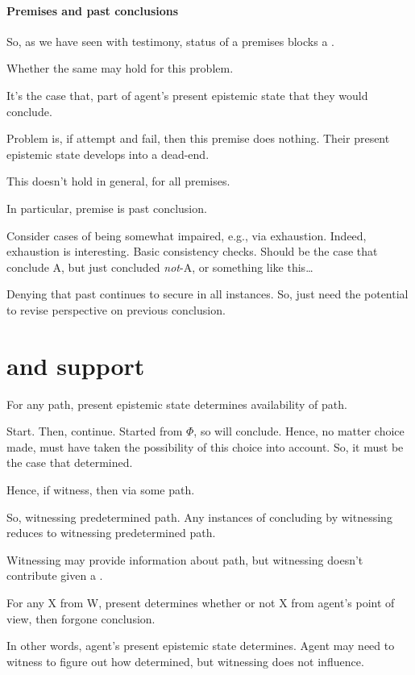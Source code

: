 \paragraph{Premises and past conclusions}

\begin{note}[Premises]
  So, as we have seen with testimony, status of a premises blocks a \requ{}.

  Whether the same may hold for this problem.

  It's the case that, part of agent's present epistemic state that they would conclude.

  Problem is, if attempt and fail, then this premise does nothing.
  Their present epistemic state develops into a dead-end.
\end{note}

\begin{note}[Note!]
  This doesn't hold in general, for all premises.

  In particular, premise is past conclusion.

  Consider cases of being somewhat impaired, e.g., via exhaustion.
  Indeed, exhaustion is interesting.
  Basic consistency checks.
  Should be the case that conclude A, but just concluded \emph{not}-A, or something like this\dots

  Denying that past continues to secure in all instances.
  So, just need the potential to revise perspective on previous conclusion.
\end{note}

\section{ and support}
\label{cha:fcs:sec:fc3-support}

\begin{note}
  \begin{proposition}
    For any path, present epistemic state determines availability of path.
  \end{proposition}

  Start.
  Then, continue.
  Started from \(\Phi\), so will conclude.
  Hence, no matter choice made, must have taken the possibility of this choice into account.
  So, it must be the case that determined.

  Hence, if witness, then via some path.

  So, witnessing predetermined path.
  Any instances of concluding by witnessing reduces to witnessing predetermined path.

  Witnessing may provide information about path, but witnessing doesn't contribute given a \requ{}.

  For any X from W,
  present determines whether or not X from agent's point of view, then forgone conclusion.

  In other words, agent's present epistemic state determines.
  Agent may need to witness to figure out how determined, but witnessing does not influence.
\end{note}


